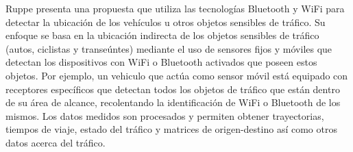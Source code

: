 Ruppe\cite{ruppe2012augmenting} presenta una propuesta que utiliza las tecnologías Bluetooth y WiFi para detectar la ubicación de los vehículos u otros objetos sensibles de tráfico. Su enfoque se basa en la ubicación indirecta de los objetos sensibles de tráfico (autos, ciclistas y transeúntes) mediante el uso de sensores fijos y móviles que detectan los dispositivos con WiFi o Bluetooth activados que poseen estos objetos. Por ejemplo, un vehiculo que actúa como sensor móvil está equipado con receptores específicos que detectan todos los objetos de tráfico que están dentro de su área de alcance, recolentando la identificación de WiFi o Bluetooth de los mismos. Los datos medidos son procesados y permiten obtener trayectorias, tiempos de viaje, estado del tráfico y matrices de origen-destino así como otros datos acerca del tráfico.

